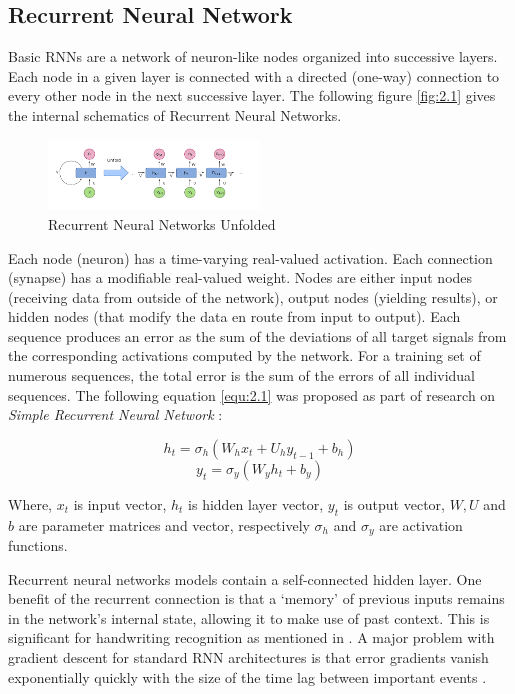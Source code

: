 \documentclass[twocolumn, switch]{article} %
\begin{document}
\subsection{Recurrent Neural Network}
\label{sub:sec:rnn}
Basic RNNs are a network of neuron-like nodes organized into successive layers. Each node in a given layer is connected with a directed (one-way) connection to every other node in the next successive layer. The following figure \eqref{fig:2.1} gives the internal schematics of Recurrent Neural Networks.

\begin{figure}[!htbp]
    \centering
    \includegraphics[width=0.5\textwidth]{Recurrent_neural_network_unfold.png}
    \caption[Recurrent Neural Networks Unfolded]{Recurrent Neural Networks Unfolded \cite{wiki:rnns}}
    \label{fig:2.1}
\end{figure}

Each node (neuron) has a time-varying real-valued activation. Each connection (synapse) has a modifiable real-valued weight. Nodes are either input nodes (receiving data from outside of the network), output nodes (yielding results), or hidden nodes (that modify the data en route from input to output). Each sequence produces an error as the sum of the deviations of all target signals from the corresponding activations computed by the network. For a training set of numerous sequences, the total error is the sum of the errors of all individual sequences. The following equation \eqref{equ:2.1} was proposed as part of research on \emph{Simple Recurrent Neural Network} \cite{wiki:rnns}:

\[h_t = \sigma_h(W_h x_t + U_h y_{t-1} + b_h)\]
\begin{equation}
    \label{equ:2.1}
    y_t = \sigma_y(W_y h_t + b_y)
\end{equation}

Where, $x_t$ is input vector, $h_t$ is hidden layer vector, $y_t$ is output vector, $W, U$ and $b$ are parameter matrices and vector, respectively $\sigma_h$ and $\sigma_y$ are activation functions.

Recurrent neural networks models contain a self-connected hidden layer. One benefit of the recurrent connection is that a `memory' of previous inputs remains in the network’s internal state, allowing it to make use of past context. This is significant for handwriting recognition as mentioned in \cite{art:ieee:consys}. A major problem with gradient descent for standard RNN architectures is that error gradients vanish exponentially quickly with the size of the time lag between important events \cite{wiki:rnns}.
\end{document}
